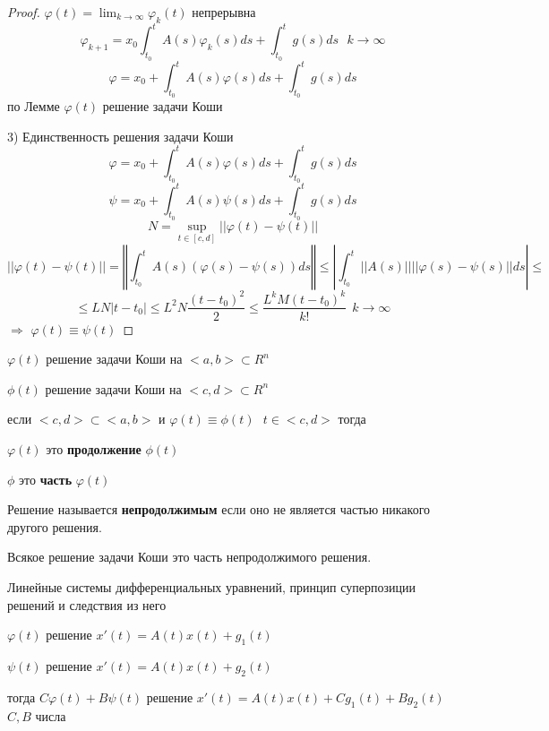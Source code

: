 \begin{proof}
  $\varphi(t) = \lim_{k \to \infty} \varphi_k(t)$ непрерывна
  $$
  \varphi_{k+1} = x_0 \int_{t_0}^t A(s) \varphi_k(s) ds + \int_{t_0}^t g(s)ds
  ~~~ k \to \infty
  $$
  $$
  \varphi = x_0 + \int_{t_0}^t A(s) \varphi(s) ds + \int_{t_0}^t g(s)ds
  $$
  по Лемме $\varphi(t)$ решение задачи Коши

  3) Единственность решения задачи Коши
  $$
  \varphi = x_0 + \int_{t_0}^t A(s) \varphi(s) ds + \int_{t_0}^t g(s)ds
  $$
  $$
  \psi = x_0 + \int_{t_0}^t A(s) \psi(s) ds + \int_{t_0}^t g(s)ds
  $$
  $$
  N = \sup_{t \in [c,d]} ||\varphi(t) - \psi(t)||
  $$
  $$
  ||\varphi(t) - \psi(t)|| = \left\Vert\int_{t_0}^t A(s)
  (\varphi(s) - \psi(s))ds \right\Vert \le \left| \int_{t_0}^t ||A(s)||
  ||\varphi(s) - \psi(s)||ds \right| \le
  $$
  $$
  \le LN|t-t_0| \le L^2 N \frac{(t - t_0)^2}{2} \le
  \frac{L^k M (t - t_0)^k}{k!} ~~ k \to \infty
  $$
  $\Rightarrow$ $\varphi(t) \equiv \psi(t)$
\end{proof}

\begin{define}
  $\varphi(t)$ решение задачи Коши на $<a,b> \subset R^n$

  $\phi(t)$ решение задачи Коши на $<c,d> \subset R^n$

  если $<c,d> \subset<a,b>$ и $\varphi(t) \equiv \phi(t) ~~~ t \in <c,d>$ тогда

  $\varphi(t)$ это {\bfseries продолжение} $\phi(t)$

  $\phi$ это {\bfseries часть} $\varphi(t)$

  Решение называется {\bfseries непродолжимым} если оно не является частью никакого
  другого решения.
\end{define}

\begin{theorem}
  Всякое решение задачи Коши это часть непродолжимого решения.
\end{theorem}

\begin{title}[\Large]
  Линейные системы дифференциальных уравнений, принцип суперпозиции решений и
  следствия из него
\end{title}

\begin{theorem}
  $\varphi(t)$ решение $x'(t) = A(t)x(t) + g_1(t)$

  $\psi(t)$ решение $x'(t) = A(t)x(t) + g_2(t)$

  тогда $C\varphi(t) + B\psi(t)$ решение $x'(t) = A(t)x(t) + Cg_1(t) + Bg_2(t)$
  $C,B$ числа
\end{theorem}

